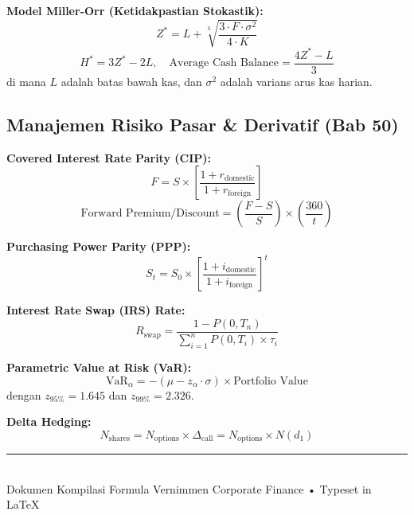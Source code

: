 \documentclass[10pt,a4paper]{article}
\begin{document}
\textbf{Model Miller-Orr (Ketidakpastian Stokastik):}
\begin{equation}
\boxed{Z^* = L + \sqrt[3]{\frac{3 \cdot F \cdot \sigma^2}{4 \cdot K}}}
\end{equation}
\begin{equation}
H^* = 3 Z^* - 2 L, \quad \text{Average Cash Balance} = \frac{4 Z^* - L}{3}
\end{equation}
di mana $L$ adalah batas bawah kas, dan $\sigma^2$ adalah varians arus kas harian.

\subsection{Manajemen Risiko Pasar \& Derivatif (Bab 50)}

\textbf{Covered Interest Rate Parity (CIP):}
\begin{equation}
F = S \times \left[\frac{1 + r_{\text{domestic}}}{1 + r_{\text{foreign}}}\right]
\end{equation}
\begin{equation}
\text{Forward Premium/Discount} = \left(\frac{F - S}{S}\right) \times \left(\frac{360}{t}\right)
\end{equation}

\textbf{Purchasing Power Parity (PPP):}
\begin{equation}
S_t = S_0 \times \left[\frac{1 + i_{\text{domestic}}}{1 + i_{\text{foreign}}}\right]^t
\end{equation}

\textbf{Interest Rate Swap (IRS) Rate:}
\begin{equation}
R_{\text{swap}} = \frac{1 - P(0, T_n)}{\sum_{i=1}^n P(0, T_i) \times \tau_i}
\end{equation}

\textbf{Parametric Value at Risk (VaR):}
\begin{equation}
\text{VaR}_\alpha = -(\mu - z_\alpha \cdot \sigma) \times \text{Portfolio Value}
\end{equation}
dengan $z_{95\%} = 1.645$ dan $z_{99\%} = 2.326$.

\textbf{Delta Hedging:}
\begin{equation}
N_{\text{shares}} = N_{\text{options}} \times \Delta_{\text{call}} = N_{\text{options}} \times N(d_1)
\end{equation}

\vfill
\begin{center}
    \rule{0.5\textwidth}{0.4pt}\\[4pt]
    {\footnotesize\color{gray} Dokumen Kompilasi Formula Vernimmen Corporate Finance • Typeset in \LaTeX}
\end{center}
\end{document}
